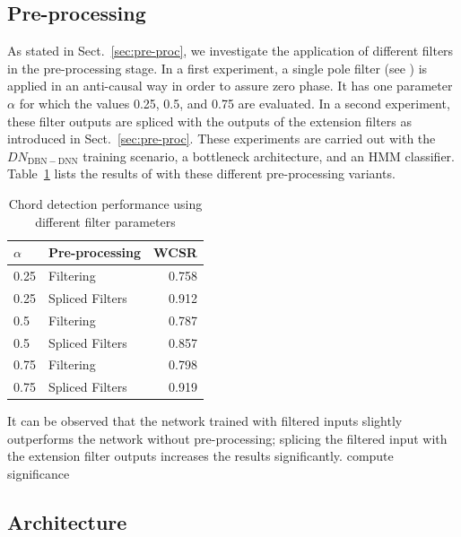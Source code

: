 \documentclass{article}
\begin{document}
\subsection{Pre-processing}
As stated in Sect.~\ref{sec:pre-proc}, we investigate the application of different filters in the pre-processing stage. 
In a first experiment, a single pole filter (see ) is applied in an anti-causal way in order to assure zero phase. It has one parameter $\alpha$ for which the values 0.25, 0.5, and 0.75 are evaluated. In a second experiment, these filter outputs are spliced with the outputs of the extension filters as introduced in Sect.~\ref{sec:pre-proc}. These experiments are carried out with the  $DN_\mathrm{DBN-DNN}$ training scenario, a bottleneck architecture, and an HMM classifier. Table~\ref{table:filter} lists the results of with these different pre-processing variants.
\begin{table}[h]
\begin{tabular*}{\columnwidth}{@{\extracolsep{\fill}}llr}
\toprule
$\alpha$    & Pre-processing  & WCSR  \\  \midrule
0.25 & Filtering             & 0.758 \\
0.25 & Spliced Filters & 0.912 \\
0.5  & Filtering             & 0.787 \\
0.5  & Spliced Filters & 0.857 \\
0.75 & Filtering             & 0.798 \\
0.75 & Spliced Filters & 0.919 \\ \bottomrule
\end{tabular*}
\caption{Chord detection performance using different filter parameters}


\label{table:filter}

\end{table}
It can be observed that the network trained with filtered inputs slightly outperforms the network without pre-processing; splicing the filtered input with the extension filter outputs increases the results significantly. {\color{red}compute significance}


\subsection{Architecture}
\end{document}
